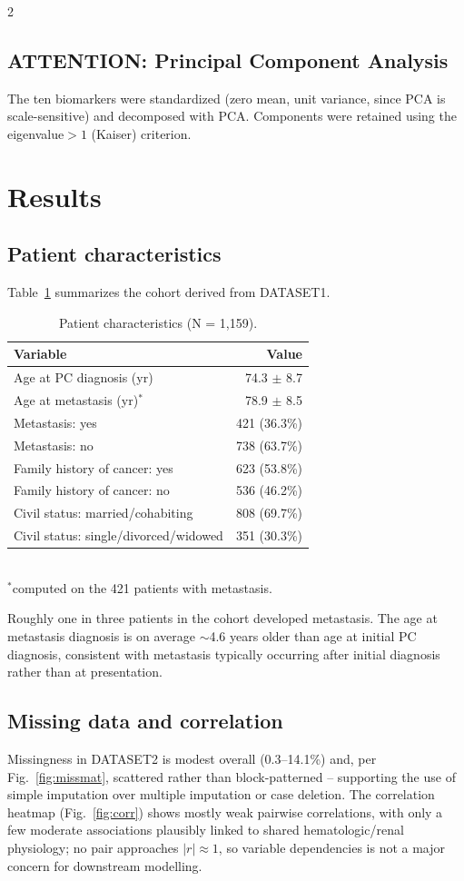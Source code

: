 ﻿\documentclass[a4paper,10pt]{article}
\begin{document}
\begin{multicols*}{2}
\subsection{ATTENTION: Principal Component Analysis}
The ten biomarkers were standardized (zero mean, unit variance, since PCA is scale-sensitive) and decomposed with PCA. Components were retained using the eigenvalue$>1$ (Kaiser) criterion.

\section{Results}

\subsection{Patient characteristics}
Table~\ref{tab:characteristics} summarizes the cohort derived from DATASET1.

\begin{table}[H]
\centering
\caption{Patient characteristics (N = 1{,}159).}
\label{tab:characteristics}
\begin{tabular}{lr}
\toprule
Variable & Value \\
\midrule
Age at PC diagnosis (yr) & 74.3 $\pm$ 8.7 \\
Age at metastasis (yr)$^{*}$ & 78.9 $\pm$ 8.5 \\
Metastasis: yes & 421 (36.3\%) \\
Metastasis: no & 738 (63.7\%) \\
Family history of cancer: yes & 623 (53.8\%) \\
Family history of cancer: no & 536 (46.2\%) \\
Civil status: married/cohabiting & 808 (69.7\%) \\
Civil status: single/divorced/widowed & 351 (30.3\%) \\
\bottomrule
\end{tabular}\\
\footnotesize{$^{*}$computed on the 421 patients with metastasis.}
\end{table}

Roughly one in three patients in the cohort developed metastasis. The age at metastasis diagnosis is on average $\sim$4.6 years older than age at initial PC diagnosis, consistent with metastasis typically occurring after initial diagnosis rather than at presentation.

\subsection{Missing data and correlation}
Missingness in DATASET2 is modest overall (0.3--14.1\%) and, per Fig.~\ref{fig:missmat}, scattered rather than block-patterned -- supporting the use of simple imputation over multiple imputation or case deletion. The correlation heatmap (Fig.~\ref{fig:corr}) shows mostly weak pairwise correlations, with only a few moderate associations plausibly linked to shared hematologic/renal physiology; no pair approaches $|r|\approx1$, so variable dependencies is not a major concern for downstream modelling.


\end{multicols*}
\end{document}
